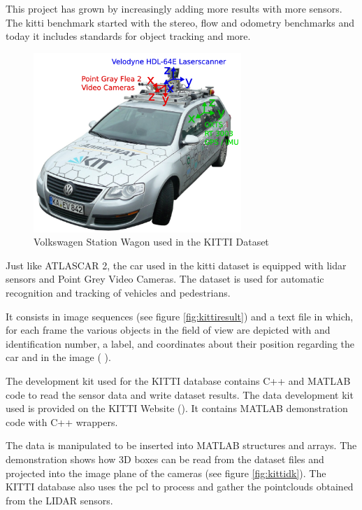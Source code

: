 This project has grown by increasingly adding more results with more sensors. The \gls{kitti} benchmark started with the stereo, flow and odometry benchmarks and today it includes standards for object tracking and more. 

\begin{figure}[htp]
	
	\centering
	\includegraphics[width=0.7\textwidth]{capstate/imgs/kitticar}
	
	\caption{Volkswagen Station Wagon used in the KITTI Dataset}
	\label{fig:kitticar}
	
\end{figure}

Just like ATLASCAR 2, the car used in the \gls{kitti} dataset is equipped with \gls{lidar} sensors and Point Grey Video Cameras. The dataset is used for automatic recognition and tracking of vehicles and pedestrians. 

It consists in image sequences (see figure \ref{fig:kittiresult}) and a text file in which, for each frame the various objects in the field of view are depicted with and identification number, a label, and coordinates about their position regarding the car and in the image ( \cite{Geiger}). 

The development kit used for the KITTI database contains C++ and MATLAB code to read the sensor data and write dataset results. The data development kit used is provided on the KITTI Website (\cite{KarlsruheInstituteofTechnology}). It contains MATLAB demonstration code with C++ wrappers. 

The data is manipulated to be inserted into MATLAB structures and arrays. The demonstration shows how 3D boxes can be read from the dataset files and projected into the image plane of the cameras (see figure \ref{fig:kittidk}). The KITTI database also uses the \gls{pcl} to process and gather the pointclouds obtained from the LIDAR sensors.

